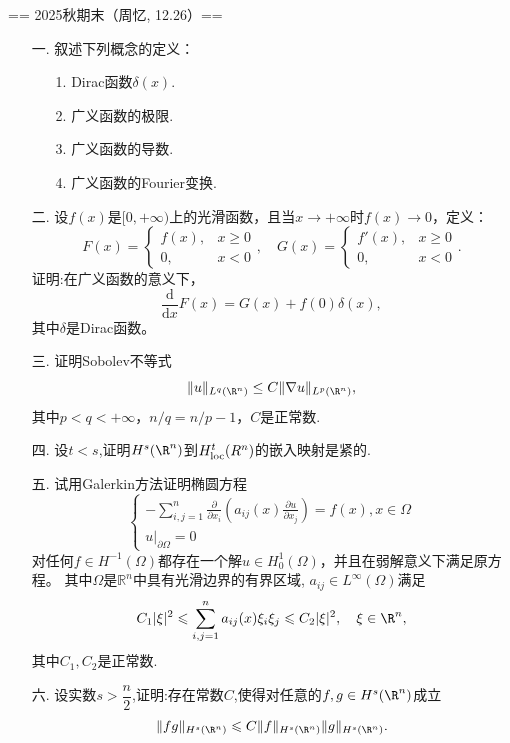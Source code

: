 == 2025秋期末（周忆, 12.26）==
\begin{enumerate}
    \item[一.] 叙述下列概念的定义：
    \begin{itemize}
        \item[1.]Dirac函数$\delta(x)$.
        \item[2.]广义函数的极限.
        \item[3.]广义函数的导数.
        \item[4.]广义函数的Fourier变换.
    \end{itemize}
    \item[二.] 设$f(x)$是$[0,+\infty)$上的光滑函数，且当$x\to+\infty$时$f(x)\to0$，定义：
    \begin{equation*}
        F(x)=\begin{cases}
            f(x),&x\geqslant0\\
            0,&x<0
        \end{cases},\quad
        G(x)=\begin{cases}
            f'(x),&x\geqslant0\\
            0,&x<0
        \end{cases}.
    \end{equation*}
    证明:在广义函数的意义下，$$
        \frac{\mathrm{d}}{\mathrm{d}x}F(x)=G(x)+f(0)\delta(x),
    $$其中$\delta$是Dirac函数。
    \item[三.] 证明Sobolev不等式\[\|u\|_{L^q(\R^n)}\leq C\|\nabla u\|_{L^p(\R^n)},\]其中$p<q<+\infty$，$n/q=n/p-1$，$C$是正常数.
    \item[四.] 设$t<s$,证明$H^s(\R^n)$到$H_{\textup{loc}}^t(R^n)$的嵌入映射是紧的.
    \item[五.] 试用Galerkin方法证明椭圆方程
    \[\begin{cases}
        -\displaystyle\sum_{i,j=1}^n\frac{\partial}{\partial x_i}\left(a_{ij}(x)\frac{\partial u}{\partial x_j}\right)=f(x), x\in\Omega\\
        \left.u\right|_{\partial\Omega}=0
    \end{cases}\]
    对任何$f\in H^{-1}(\Omega)$都存在一个解$u\in H_0^1(\Omega)$，并且在弱解意义下满足原方程。
    其中$\Omega$是$\mathbb{R}^n$中具有光滑边界的有界区域, $a_{ij}\in L^{\infty}(\Omega)$满足
    \[C_1|\xi|^2\leqslant\sum_{i,j=1}^na_{ij}(x)\xi_i\xi_j\leqslant C_2|\xi|^2,\quad \xi\in\R^n,\]
    其中$C_1,C_2$是正常数.
    \item[六.] 设实数$s>\dfrac{n}{2}$,证明:存在常数$C$,使得对任意的$f,g\in H^s(\R^n)$成立
        \[\|fg\|_{H^s(\R^n)}\leqslant C\|f\|_{H^s(\R^n)}\|g\|_{H^s(\R^n)}.\]
    
\end{enumerate}


